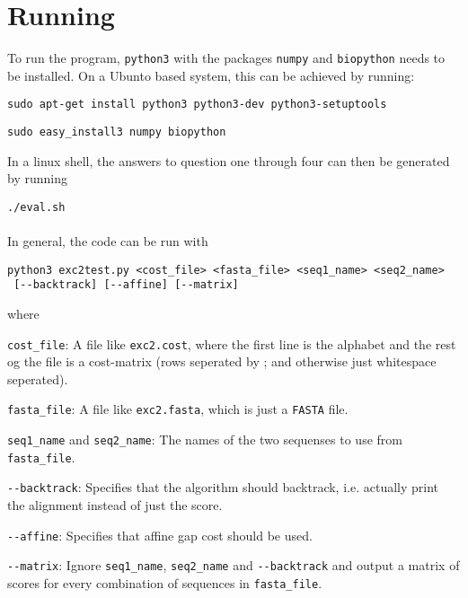 \section{Running}

To run the program, \verb|python3| with the packages \verb|numpy| and
\verb|biopython| needs to be installed. On a Ubunto based system, this can
be achieved by running:

\verb|sudo apt-get install python3 python3-dev python3-setuptools|

\verb|sudo easy_install3 numpy biopython|

In a linux shell, the answers to question one through four can then be
generated by running

\verb|./eval.sh|

\paragraph{}
In general, the code can be run with

\begin{verbatim}
python3 exc2test.py <cost_file> <fasta_file> <seq1_name> <seq2_name>
 [--backtrack] [--affine] [--matrix]
\end{verbatim}

where

\begin{description}
\item{\verb|cost_file|:} A file like \verb|exc2.cost|, where the
  first line is the alphabet and the rest og the file is a cost-matrix
  (rows seperated by ; and otherwise just whitespace seperated).
\item{\verb|fasta_file|:} A file like \verb|exc2.fasta|, which is just
  a \verb|FASTA| file.
\item{\verb|seq1_name| and \verb|seq2_name|:} The names of the two
  sequenses to use from \verb|fasta_file|.
\item{\verb|--backtrack|:} Specifies that the algorithm should
  backtrack, i.e. actually print the alignment instead of just the
  score.
\item{\verb|--affine|:} Specifies that affine gap cost should be used.
\item{\verb|--matrix|:} Ignore \verb|seq1_name|, \verb|seq2_name| and
  \verb|--backtrack| and output a matrix of scores for every
  combination of sequences in \verb|fasta_file|.
\end{description}
